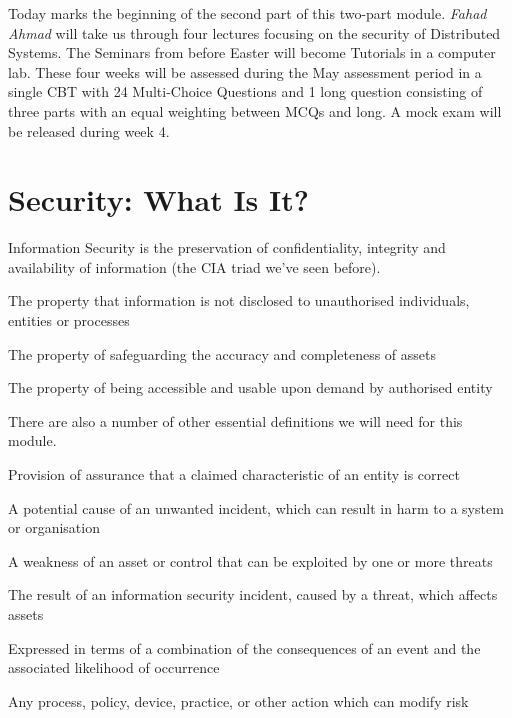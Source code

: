 
Today marks the beginning of the second part of this two-part module. \textit{Fahad Ahmad} will take us through four lectures focusing on the security of Distributed Systems. The Seminars from before Easter will become Tutorials in a computer lab. These four weeks will be assessed during the May assessment period in a single CBT with 24 Multi-Choice Questions and 1 long question consisting of three parts with an equal weighting between MCQs and long. A mock exam will be released during week 4. 

\section{Security: What Is It?}
Information Security is the preservation of confidentiality, integrity and availability of information (the CIA triad we've seen before).

\begin{define}
\item[Confidentiality] The property that information is not disclosed to unauthorised individuals, entities or processes
\item[Integrity] The property of safeguarding the accuracy and completeness of assets
\item[Availability] The property of being accessible and usable upon demand by authorised entity
\end{define}

There are also a number of other essential definitions we will need for this module.

\begin{define}
\item[Authentication] Provision of assurance that a claimed characteristic of an entity is correct
\item[Threat] A potential cause of an unwanted incident, which can result in harm to a system or organisation
\item[Vulnerability] A weakness of an asset or control that can be exploited by one or more threats
\item[Impact] The result of an information security incident, caused by a threat, which affects assets
\item[Risk] Expressed in terms of a combination of the consequences of an event and the associated likelihood of occurrence
\item[Control] Any process, policy, device, practice, or other action which can modify risk
\end{define}

